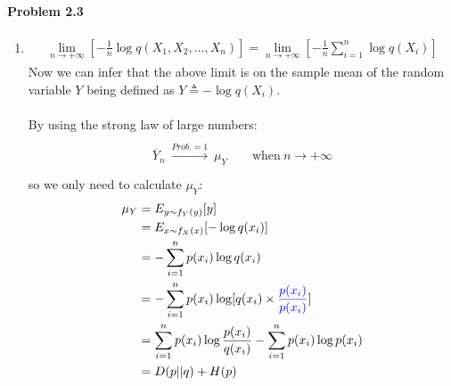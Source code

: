 \documentclass[12pt, letterpaper]{scrartcl}
\begin{document}
\paragraph*{Problem 2.3} \hfill\newline
\begin{enumerate}[((a))]
    \item
    \begin{align*}
        \lim_{n\rightarrow+\infty}\left[-\frac{1}{n}\log q(X_1,X_2,\dots,X_n)\right]=\lim_{n\rightarrow+\infty}\left[-\frac{1}{n}\sum_{i=1}^n\log q(X_i)\right]
    \end{align*}
    Now we can infer that the above limit is on the sample mean of the random variable $Y$ being defined as $Y\triangleq-\log q(X_i)$.\\\\
    By using the strong law of large numbers:
    \begin{align*}
        \begin{matrix}{}\\{\overline {Y}}_{n}\ {\xrightarrow {Prob.=1}}\ \mu_Y \qquad {\textrm {when}}\ n\to +\infty\\{}\end{matrix}
    \end{align*}
    so we only need to calculate $\mu_Y$:
    \begin{align*}
        \mu_Y&=E_{y\sim f_Y(y)}[y]\\
        &=E_{x\sim f_X(x)}[-\log q(x_i)]\\
        &=-\sum_{i=1}^{n}p(x_i)\log q(x_i)\\
        &=-\sum_{i=1}^{n}p(x_i)\log[q(x_i)\times\mathbin{\color{blue}\frac{p(x_i)}{p(x_i)}}]\\
        &=\sum_{i=1}^{n}p(x_i)\log\frac{p(x_i)}{q(x_i)}-\sum_{i=1}^{n}p(x_i)\log p(x_i)\\
        &=D(p||q)+H(p)
    \end{align*}
    

\end{enumerate}
\end{document}
